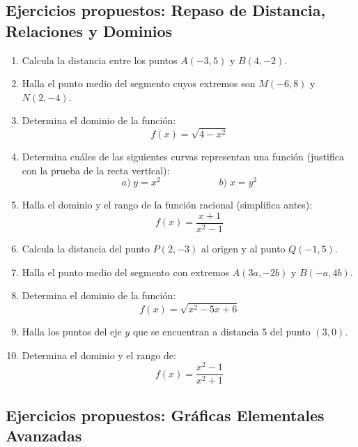 \documentclass[12pt, letterpaper]{article}
\begin{document}
\subsection{Ejercicios propuestos: Repaso de Distancia, Relaciones y Dominios}

\begin{enumerate}[resume=ejercicios, leftmargin=*]
  \item \facil{} Calcula la distancia entre los puntos $A(-3, 5)$ y $B(4, -2)$.

  \item \facil{} Halla el punto medio del segmento cuyos extremos son $M(-6, 8)$ y $N(2, -4)$.

  \item \facil{} Determina el dominio de la función:
        $$f(x) = \sqrt{4 - x^2}$$

  \item \medio{} Determina cuáles de las siguientes curvas representan una función (justifica con la prueba de la recta vertical):
        $$a)\; y = x^2 \qquad\qquad\qquad b)\; x = y^2$$

  \item \medio{} Halla el dominio y el rango de la función racional (simplifica antes):
        $$f(x) = \frac{x + 1}{x^2 - 1}$$

  \item \medio{} Calcula la distancia del punto $P(2, -3)$ al origen y al punto $Q(-1, 5)$.

  \item \medio{} Halla el punto medio del segmento con extremos $A(3a, -2b)$ y $B(-a, 4b)$.

  \item \dificil{} Determina el dominio de la función:
        $$f(x) = \sqrt{x^2 - 5x + 6}$$

  \item \dificil{} Halla los puntos del eje $y$ que se encuentran a distancia $5$ del punto $(3, 0)$.

  \item \dificil{} Determina el dominio y el rango de:
        $$f(x) = \frac{x^2 - 1}{x^2 + 1}$$
\end{enumerate}

\subsection{Ejercicios propuestos: Gráficas Elementales Avanzadas}
\end{document}

